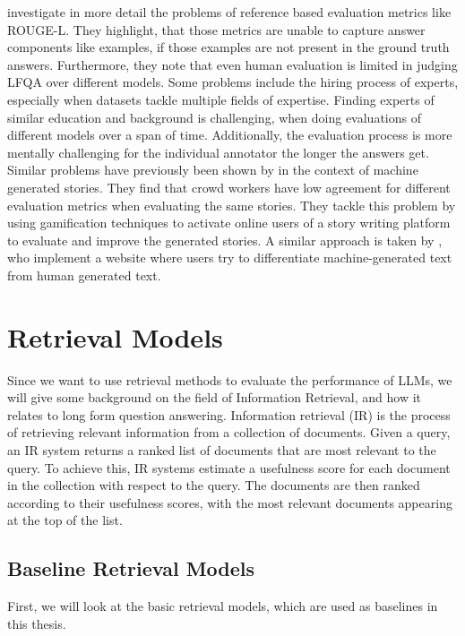 \cite{krishna:2021} investigate in more detail the problems of reference based evaluation metrics like ROUGE-L. 
They highlight, that those metrics are unable to capture answer components like examples, if those examples are not present in the ground truth answers. 
Furthermore, they note that even human evaluation is limited in judging LFQA over different models.
Some problems include the hiring process of experts, especially when datasets tackle multiple fields of expertise.
Finding experts of similar education and background is challenging, when doing evaluations of different models over a span of time.
Additionally, the evaluation process is more mentally challenging for the individual annotator the longer the answers get.
Similar problems have previously been shown by \cite{akoury:2020} in the context of machine generated stories.
They find that crowd workers have low agreement for different evaluation metrics when evaluating the same stories.
They tackle this problem by using gamification techniques to activate online users of a story writing platform to evaluate and improve the generated stories.
A similar approach is taken by \cite{dugan:2020}, who implement a website where users try to differentiate machine-generated text from human generated text.
\\

\section{Retrieval Models}\label{retrieval-models}
Since we want to use retrieval methods to evaluate the performance of LLMs, we will give some background on  the field of Information Retrieval, and how it relates to long form question answering.
Information retrieval (IR) is the process of retrieving relevant information from a collection of documents.
Given a query, an IR system returns a ranked list of documents that are most relevant to the query.
To achieve this, IR systems estimate a usefulness score for each document in the collection with respect to the query.
The documents are then ranked according to their usefulness scores, with the most relevant documents appearing at the top of the list.



\subsection{Baseline Retrieval Models}\label{baseline-retrieval-models}
First, we will look at the basic retrieval models, which are used as baselines in this thesis.


